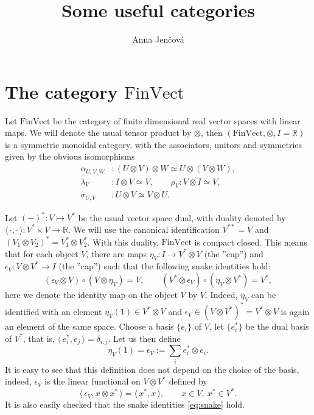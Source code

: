 \documentclass[12pt]{article}
\title{Some useful categories}
\author{Anna Jen\v cov\'a}
\theoremstyle{definition}
\theoremstyle{remark}
\def\<{\langle\,}
\def\>{\,\rangle}
\def \FV{\mathrm{FinVect}}
\begin{document}
\maketitle


\section{The category $\FV$}

Let  $\FV$ be the category of finite dimensional real vector spaces with linear maps. 
We will denote the usual tensor product by $\otimes$, then  $(\FV,\otimes, I=\mathbb R)$
is a symmetric monoidal category, with the associators, unitors and symmetries given by
the obvious isomorphisms 
\begin{align*}
\alpha_{U,V,W}&:(U\otimes V)\otimes W\simeq U\otimes (V\otimes W), \\
\lambda_V&: I\otimes
V\simeq
V, \qquad \rho_V: V\otimes I\simeq V,\\
\sigma_{U,V}&: U\otimes V\simeq V\otimes U.
\end{align*}


Let  $(-)^*: V\mapsto V^*$ be the usual vector space dual, with duality denoted by
$\<\cdot,\cdot\>: V^*\times V\to \mathbb R$. We will use the canonical identification
$V^{**}=V$ and $(V_1\otimes V_2)^*=V_1^*\otimes V_2^*$. With this duality, $\FV$ is
compact closed. This means that for each object $V$, there are maps $\eta_V: I\to V^*\otimes
V$ (the ''cup'') and $\epsilon_V: V\otimes V^*\to I$ (the ''cap'') such that the following snake
identities hold:
\begin{equation}\label{eq:snake}
(\epsilon_V\otimes V)\circ (V\otimes \eta_V)=V,\qquad (V^*\otimes \epsilon_V)\circ
(\eta_V\otimes V^*)=V^*,
\end{equation}
here we denote the identity map on the object $V$ by $V$. Indeed, $\eta_V$ can be
identified with an element $\eta_V(1)\in V^*\otimes V$ and   $\epsilon_V\in (V\otimes
V^*)^*=V^*\otimes V$ is again an element of the same space.  Choose a basis
$\{e_i\}$ of $V$, let $\{e_i^*\}$ be the dual basis of $V^*$, that is,
$\<e_i^*,e_j\>=\delta_{i,j}$. Let us then define
\[
\eta_V(1)=\epsilon_V:=\sum_i e_i^*\otimes e_i.
\]
It is easy to see that this definition does not depend on the choice of the basis, indeed,
$\epsilon_V$ is the linear functional on $V\otimes V^*$ defined by
\[
\<\epsilon_V, x\otimes x^*\>=\<x^*,x\>,\qquad x\in V, \ x^*\in V^*.
\]
It is also easily checked that the snake identities \eqref{eq:snake} hold.
\end{document}
